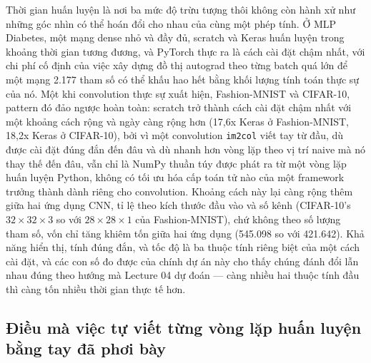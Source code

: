 \documentclass[11pt]{article}
\newcommand{\code}[1]{\texttt{#1}}
\begin{document}
Thời gian huấn luyện là nơi ba mức độ trừu tượng thôi không còn hành xử
như những góc nhìn có thể hoán đổi cho nhau của cùng một phép tính. Ở MLP
Diabetes, một mạng dense nhỏ và đầy đủ, scratch và Keras huấn luyện trong
khoảng thời gian tương đương, và PyTorch thực ra là cách cài đặt chậm
nhất, với chi phí cố định của việc xây dựng đồ thị autograd theo từng
batch quá lớn để một mạng 2.177 tham số có thể khấu hao hết bằng khối
lượng tính toán thực sự của nó. Một khi convolution thực sự xuất hiện,
Fashion-MNIST và CIFAR-10, pattern đó đảo ngược hoàn toàn: scratch trở
thành cách cài đặt chậm nhất với một khoảng cách rộng và ngày càng rộng
hơn (17,6x Keras ở Fashion-MNIST, 18,2x Keras ở CIFAR-10), bởi vì một
convolution \code{im2col} viết tay từ đầu, dù được cài đặt đúng đắn đến
đâu và dù nhanh hơn vòng lặp theo vị trí naive mà nó thay thế đến đâu, vẫn
chỉ là NumPy thuần túy được phát ra từ một vòng lặp huấn luyện Python,
không có tối ưu hóa cấp toán tử nào của một framework trưởng thành dành
riêng cho convolution. Khoảng cách này lại càng rộng thêm giữa hai ứng
dụng CNN, tỉ lệ theo kích thước đầu vào và số kênh (CIFAR-10's
$32\times32\times3$ so với $28\times28\times1$ của Fashion-MNIST), chứ
không theo số lượng tham số, vốn chỉ tăng khiêm tốn giữa hai ứng dụng
(545.098 so với 421.642). Khả năng hiển thị, tính đúng đắn, và tốc độ là
ba thuộc tính riêng biệt của một cách cài đặt, và các con số đo được của
chính dự án này cho thấy chúng đánh đổi lẫn nhau đúng theo hướng mà
Lecture 04 dự đoán — càng nhiều hai thuộc tính đầu thì càng tốn nhiều thời
gian thực tế hơn.

\subsection{Điều mà việc tự viết từng vòng lặp huấn luyện bằng tay đã phơi
bày}
\end{document}
